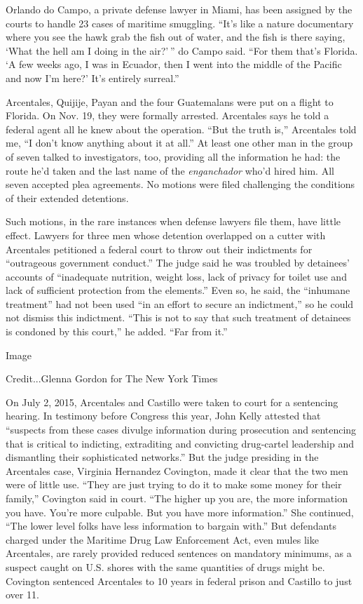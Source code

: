 Orlando do Campo, a private defense lawyer in Miami, has been assigned
by the courts to handle 23 cases of maritime smuggling. ``It's like a
nature documentary where you see the hawk grab the fish out of water,
and the fish is there saying, `What the hell am I doing in the air?' ''
do Campo said. ``For them that's Florida. `A few weeks ago, I was in
Ecuador, then I went into the middle of the Pacific and now I'm here?'
It's entirely surreal.''

Arcentales, Quijije, Payan and the four Guatemalans were put on a flight
to Florida. On Nov. 19, they were formally arrested. Arcentales says he
told a federal agent all he knew about the operation. ``But the truth
is,'' Arcentales told me, ``I don't know anything about it at all.'' At
least one other man in the group of seven talked to investigators, too,
providing all the information he had: the route he'd taken and the last
name of the \emph{enganchador} who'd hired him. All seven accepted plea
agreements. No motions were filed challenging the conditions of their
extended detentions.

Such motions, in the rare instances when defense lawyers file them, have
little effect. Lawyers for three men whose detention overlapped on a
cutter with Arcentales petitioned a federal court to throw out their
indictments for ``outrageous government conduct.'' The judge said he was
troubled by detainees' accounts of ``inadequate nutrition, weight loss,
lack of privacy for toilet use and lack of sufficient protection from
the elements.'' Even so, he said, the ``inhumane treatment'' had not
been used ``in an effort to secure an indictment,'' so he could not
dismiss this indictment. ``This is not to say that such treatment of
detainees is condoned by this court,'' he added. ``Far from it.''

Image

Credit...Glenna Gordon for The New York Times

On July 2, 2015, Arcentales and Castillo were taken to court for a
sentencing hearing. In testimony before Congress this year, John Kelly
attested that ``suspects from these cases divulge information during
prosecution and sentencing that is critical to indicting, extraditing
and convicting drug-cartel leadership and dismantling their
sophisticated networks.'' But the judge presiding in the Arcentales
case, Virginia Hernandez Covington, made it clear that the two men were
of little use. ``They are just trying to do it to make some money for
their family,'' Covington said in court. ``The higher up you are, the
more information you have. You're more culpable. But you have more
information.'' She continued, ``The lower level folks have less
information to bargain with.'' But defendants charged under the Maritime
Drug Law Enforcement Act, even mules like Arcentales, are rarely
provided reduced sentences on mandatory minimums, as a suspect caught on
U.S. shores with the same quantities of drugs might be. Covington
sentenced Arcentales to 10 years in federal prison and Castillo to just
over 11.

